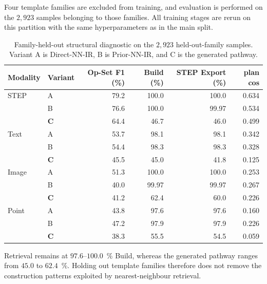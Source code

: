 \documentclass[preprint,12pt]{elsarticle}
\begin{document}
Four template families are excluded from training, and evaluation is performed on the $2{,}923$ samples belonging to those families. All training stages are rerun on this partition with the same hyperparameters as in the main split.

\begin{table}[htbp]
  \centering
  \footnotesize
  \caption{Family-held-out structural diagnostic on the $2{,}923$ held-out-family samples. Variant A is Direct-NN-IR, B is Prior-NN-IR, and C is the generated pathway.}
  \label{tab:compositional}
  \begin{tabular}{llrrrr}
    \toprule
    Modality & Variant    & Op-Set F1 (\%) & Build (\%) & STEP Export (\%) & plan cos \\
    \midrule
    STEP     & A          & 79.2           & 100.0      & 100.0            & 0.634    \\
             & B          & 76.6           & 100.0      & 99.97            & 0.534    \\
             & \textbf{C} & 64.4           & 46.7       & 46.0             & 0.499    \\
    Text     & A          & 53.7           & 98.1       & 98.1             & 0.342    \\
             & B          & 54.4           & 98.3       & 98.3             & 0.328    \\
             & \textbf{C} & 45.5           & 45.0       & 41.8             & 0.125    \\
    Image    & A          & 51.3           & 100.0      & 100.0            & 0.253    \\
             & B          & 40.0           & 99.97      & 99.97            & 0.267    \\
             & \textbf{C} & 41.2           & 62.4       & 60.0             & 0.226    \\
    Point    & A          & 43.8           & 97.6       & 97.6             & 0.160    \\
             & B          & 47.2           & 97.9       & 97.9             & 0.226    \\
             & \textbf{C} & 38.3           & 55.5       & 54.5             & 0.059    \\
    \bottomrule
  \end{tabular}
\end{table}

Retrieval remains at $97.6$--$100.0$~\% Build, whereas the generated pathway ranges from $45.0$ to $62.4$~\%. Holding out template families therefore does not remove the construction patterns exploited by nearest-neighbour retrieval.
\end{document}
